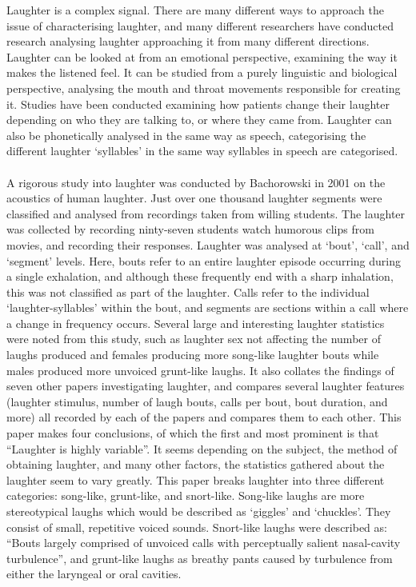 \documentclass[a4paper,11pt,notitlepage]{article}
\begin{document}
Laughter is a complex signal. There are many different ways to approach the issue of characterising laughter, and many different researchers have conducted research analysing laughter approaching it from many different directions. Laughter can be looked at from an emotional perspective, examining the way it makes the listened feel. It can be studied from a purely linguistic and biological perspective, analysing the mouth and throat movements responsible for creating it. Studies have been conducted examining how patients change their laughter depending on who they are talking to, or where they came from. Laughter can also be phonetically analysed in the same way as speech, categorising the different laughter `syllables' in the same way syllables in speech are categorised.\\
\\
A rigorous study into laughter was conducted by Bachorowski in 2001\cite{bachorowski2001acoustic} on the acoustics of human laughter. Just over one thousand laughter segments were classified and analysed from recordings taken from willing students. The laughter was collected by recording ninty-seven students watch humorous clips from movies, and recording their responses. Laughter was analysed at `bout', `call', and `segment' levels. Here, bouts refer to an entire laughter episode occurring during a single exhalation, and although these frequently end with a sharp inhalation, this was not classified as part of the laughter. Calls refer to the individual `laughter-syllables' within the bout, and segments are sections within a call where a change in frequency occurs. Several large and interesting laughter statistics were noted from this study, such as laughter sex not affecting the number of laughs produced and females producing more song-like laughter bouts while males produced more unvoiced grunt-like laughs. It also collates the findings of seven other papers investigating laughter, and compares several laughter features (laughter stimulus, number of laugh bouts, calls per bout, bout duration, and more) all recorded by each of the papers and compares them to each other. This paper makes four conclusions, of which the first and most prominent is that ``Laughter is highly variable''. It seems depending on the subject, the method of obtaining laughter, and many other factors, the statistics gathered about the laughter seem to vary greatly. This paper breaks laughter into three different categories: song-like, grunt-like, and snort-like. Song-like laughs are more stereotypical laughs which would be described as `giggles' and `chuckles'. They consist of small, repetitive voiced sounds. Snort-like laughs were described as: ``Bouts largely comprised of unvoiced calls with perceptually salient nasal-cavity turbulence'', and grunt-like laughs as breathy pants caused by turbulence from either the laryngeal or oral cavities.\cite{bachorowski2001acoustic}\\
\\
\end{document}
